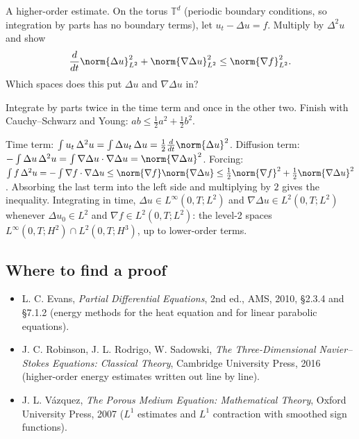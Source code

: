 \begin{exercise}
  A higher-order estimate. On the torus $\mathbb{T}^d$ (periodic boundary conditions, so integration by parts has no boundary terms), let $u_t - \Delta u = f$. Multiply by $\Delta^2 u$ and show
  \[
  \frac{d}{dt}\norm{\Delta u}_{L^2}^2 + \norm{\nabla\Delta u}_{L^2}^2 \le \norm{\nabla f}_{L^2}^2 .
  \]
  Which spaces does this put $\Delta u$ and $\nabla\Delta u$ in?
  \begin{hint}
    Integrate by parts twice in the time term and once in the other two. Finish with Cauchy--Schwarz and Young: $ab \le \frac12a^2 + \frac12b^2$.
  \end{hint}
  \begin{solution}
    Time term: $\int u_t\,\Delta^2u = \int \Delta u_t\,\Delta u = \frac12\frac{d}{dt}\norm{\Delta u}^2$. Diffusion term: $-\int\Delta u\,\Delta^2u = \int\nabla\Delta u\cdot\nabla\Delta u = \norm{\nabla\Delta u}^2$. Forcing: $\int f\,\Delta^2u = -\int\nabla f\cdot\nabla\Delta u \le \norm{\nabla f}\norm{\nabla\Delta u} \le \frac12\norm{\nabla f}^2 + \frac12\norm{\nabla\Delta u}^2$. Absorbing the last term into the left side and multiplying by $2$ gives the inequality. Integrating in time, $\Delta u \in L^\infty(0,T;L^2)$ and $\nabla\Delta u \in L^2(0,T;L^2)$ whenever $\Delta u_0 \in L^2$ and $\nabla f \in L^2(0,T;L^2)$: the level-2 spaces $L^\infty(0,T;H^2)\cap L^2(0,T;H^3)$, up to lower-order terms.
  \end{solution}
\end{exercise}

\subsection*{Where to find a proof}

\begin{itemize}
\item L. C. Evans, \emph{Partial Differential Equations}, 2nd ed., AMS, 2010, §2.3.4 and §7.1.2 (energy methods for the heat equation and for linear parabolic equations).
\item J. C. Robinson, J. L. Rodrigo, W. Sadowski, \emph{The Three-Dimensional Navier--Stokes Equations: Classical Theory}, Cambridge University Press, 2016 (higher-order energy estimates written out line by line).
\item J. L. Vázquez, \emph{The Porous Medium Equation: Mathematical Theory}, Oxford University Press, 2007 ($L^1$ estimates and $L^1$ contraction with smoothed sign functions).
\end{itemize}

